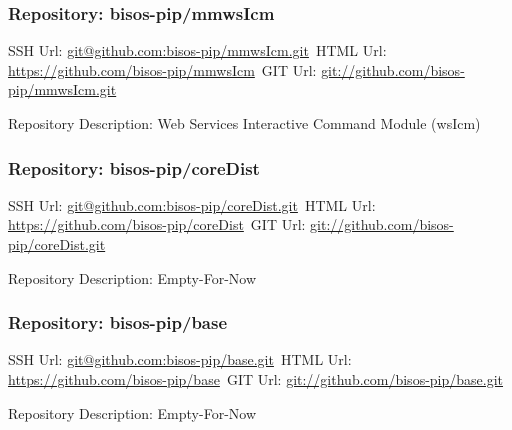 \subsubsection{Repository: bisos-pip/mmwsIcm}

SSH Url:  \url{git@github.com:bisos-pip/mmwsIcm.git}\
HTML Url: \url{https://github.com/bisos-pip/mmwsIcm}\
GIT Url:  \url{git://github.com/bisos-pip/mmwsIcm.git}

Repository Description: Web Services Interactive Command Module (wsIcm)

\subsubsection{Repository: bisos-pip/coreDist}

SSH Url:  \url{git@github.com:bisos-pip/coreDist.git}\
HTML Url: \url{https://github.com/bisos-pip/coreDist}\
GIT Url:  \url{git://github.com/bisos-pip/coreDist.git}

Repository Description: Empty-For-Now

\subsubsection{Repository: bisos-pip/base}

SSH Url:  \url{git@github.com:bisos-pip/base.git}\
HTML Url: \url{https://github.com/bisos-pip/base}\
GIT Url:  \url{git://github.com/bisos-pip/base.git}

Repository Description: Empty-For-Now
